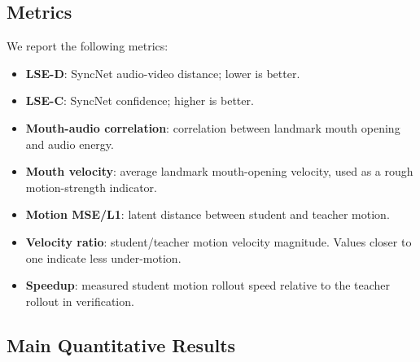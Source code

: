 \documentclass{article}
\begin{document}
\subsection{Metrics}

We report the following metrics:
\begin{itemize}
    \item \textbf{LSE-D}: SyncNet audio-video distance; lower is better.
    \item \textbf{LSE-C}: SyncNet confidence; higher is better.
    \item \textbf{Mouth-audio correlation}: correlation between landmark mouth opening and audio energy.
    \item \textbf{Mouth velocity}: average landmark mouth-opening velocity, used as a rough motion-strength indicator.
    \item \textbf{Motion MSE/L1}: latent distance between student and teacher motion.
    \item \textbf{Velocity ratio}: student/teacher motion velocity magnitude. Values closer to one indicate less under-motion.
    \item \textbf{Speedup}: measured student motion rollout speed relative to the teacher rollout in verification.
\end{itemize}

\subsection{Main Quantitative Results}

\begin{table}[t]
\centering
\scriptsize
\setlength{\tabcolsep}{3.2pt}
\caption{Person1 60-second comparison. Teacher is best overall. Mixed anchors increase visible motion strength and improve velocity ratio, while real anchors better match teacher latents.}
\label{tab:person1}
\end{table}
\end{document}
